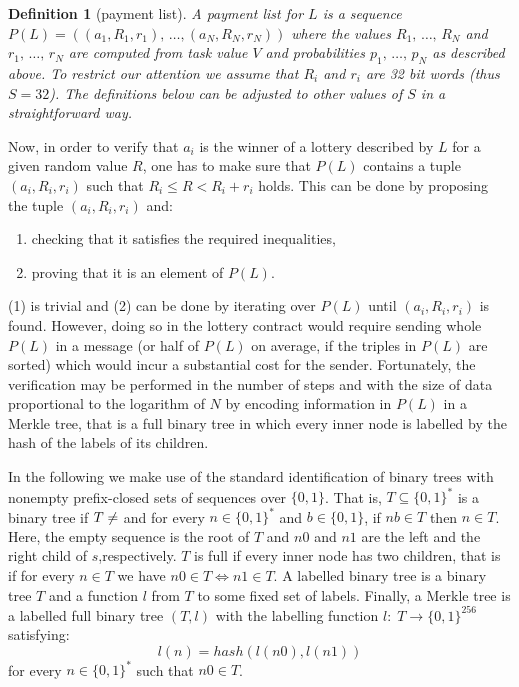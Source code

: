 \documentclass[a4paper]{article}
\newtheorem*{dfnt}{Definition}
\begin{document}
\begin{dfnt}[payment list]
A payment list for $L$ is a sequence $P(L) = ((a_1, R_1, r_1), \,\ldots, (a_N, R_N, r_N))$ where the values $R_1,\,\ldots,\, R_N$ and $r_1,\,\ldots,\, r_N$ are computed from task value $V$ and probabilities $p_1,\,\ldots,\,p_N$ as described above. To restrict our attention we assume that $R_i$ and $r_i$ are 32 bit words (thus $S = 32$). The definitions below can be adjusted to other values of $S$ in a straightforward way.
\end{dfnt}

Now, in order to verify that $a_i$ is the winner of a lottery described by $L$ for a given random value $R$, one has to
make sure that $P(L)$ contains a tuple $(a_i, R_i, r_i)$ such that $R_i \leq R < R_i + r_i$ holds.
This can be done by proposing the tuple $(a_i, R_i, r_i)$ and:
\begin{enumerate}
\item checking that it satisfies the required inequalities,
\item proving that it is an element of $P(L)$.
\end{enumerate}

(1) is trivial and (2) can be done by iterating over $P(L)$ until $(a_i, R_i, r_i)$ is found. However,
doing so in the lottery contract would require sending whole $P(L)$ in a message (or half of $P(L)$ on average,
if the triples in $P(L)$ are sorted) which would incur a substantial cost for the sender. Fortunately, the verification
may be performed in the number of steps and with the size of data proportional to the logarithm of $N$ by encoding
information in $P(L)$ in a Merkle tree, that is a full binary tree in which every inner node is labelled by the hash
of the labels of its children.

In the following we make use of the standard identification of binary trees with nonempty prefix-closed sets
of sequences over $\{0,1\}$. That is, $T \subseteq \{0,1\}^*$ is a binary tree if $T \neq \empty$ and for every
$n \in \{0,1\}^*$ and $b \in \{0,1\}$, if $nb \in T$ then $n \in T$. Here, the empty sequence is the root of $T$ and $n0$
 and $n1$ are the left and the right child of $s$,respectively.
 $T$ is full if every inner node has two children, that is if for every $n \in T$ we have $n0 \in T \iff n1 \in T$.
 A labelled binary tree is a binary tree $T$ and a function $l$ from $T$ to some fixed set of labels.
 Finally, a Merkle tree is a labelled full binary tree $(T, l)$ with the labelling function $l:\; T \rightarrow \{0,1\}^{256}$ satisfying:
 \begin{displaymath}
l(n) = hash(l(n0), l(n1))
\end{displaymath}
for every $n \in \{0,1\}^*$ such that $n0 \in T$.
\end{document}
